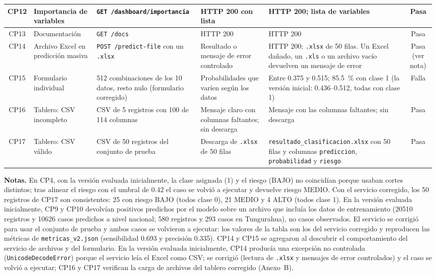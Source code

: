 \begin{longtable}{|c|p{2.2cm}|p{2.7cm}|p{2.4cm}|p{3.1cm}|c|}
  CP12 & Importancia de variables & \texttt{GET /dashboard/}\allowbreak\texttt{importancia} & HTTP 200 con lista & HTTP 200; lista de variables & Pasa\\ \hline
  CP13 & Documentación & \texttt{GET /docs} & HTTP 200 & HTTP 200 & Pasa\\ \hline
  CP14 & Archivo Excel en predicción masiva & \texttt{POST /predict-file} con un \texttt{.xlsx} & Resultado o mensaje de error controlado & HTTP 200; \texttt{.xlsx} de 50 filas. Un Excel dañado, un \texttt{.xls} o un archivo vacío devuelven un mensaje de error & Pasa (ver nota)\\ \hline
  CP15 & Formulario individual & 512 combinaciones de los 10 datos, resto nulo (formulario corregido) & Probabilidades que varíen según los datos & Entre 0.375 y 0.515; \SI{85.5}{\percent} con clase 1 (la versión inicial: 0.436--0.512, todas con clase 1) & Falla\\ \hline
  CP16 & Tablero: CSV incompleto & CSV de 5 registros con 100 de 114 columnas & Mensaje claro con columnas faltantes; sin descarga & Mensaje con las columnas faltantes; sin descarga & Pasa\\ \hline
  CP17 & Tablero: CSV válido & CSV de 50 registros del conjunto de prueba & Descarga de \texttt{.xlsx} de 50 filas & \texttt{resultado\_clasificacion.xlsx} con 50 filas y columnas \texttt{prediccion}, \texttt{probabilidad} y \texttt{riesgo} & Pasa\\ \hline
\end{longtable}
\endgroup

\noindent\textbf{Notas.} En CP4, con la versión evaluada inicialmente, la clase asignada (1) y el riesgo (BAJO) no coincidían porque usaban cortes distintos; tras alinear el riesgo con el umbral de 0.42 el caso se volvió a ejecutar y devuelve riesgo MEDIO. Con el servicio corregido, los 50 registros de CP17 son consistentes: 25 con riesgo BAJO (todos clase 0), 21 MEDIO y 4 ALTO (todos clase 1). En la versión evaluada inicialmente, CP9 y CP10 devolvían positivos predichos por el modelo sobre un archivo que incluía los datos de entrenamiento (\num{20510} registros y \num{10626} casos predichos a nivel nacional; 580 registros y 293 casos en Tungurahua), no casos observados. El servicio se corrigió para usar el conjunto de prueba y ambos casos se volvieron a ejecutar: los valores de la tabla son los del servicio corregido y reproducen las métricas de \texttt{metricas\_v2.json} (sensibilidad 0.693 y precisión 0.335). CP14 y CP15 se agregaron al descubrir el comportamiento del servicio de archivos y del formulario. En la versión evaluada inicialmente, CP14 producía una excepción no controlada (\texttt{UnicodeDecodeError}) porque el servicio leía el Excel como CSV; se corrigió (lectura de \texttt{.xlsx} y mensajes de error controlados) y el caso se volvió a ejecutar; CP16 y CP17 verifican la carga de archivos del tablero corregido (Anexo~B).

